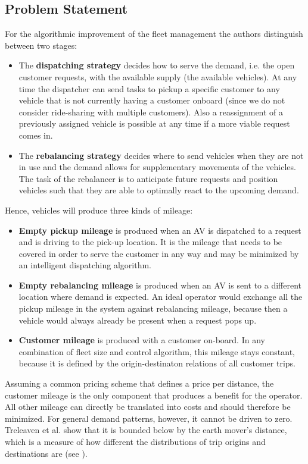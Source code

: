 \subsection{Problem Statement}

For the algorithmic improvement of the fleet management the authors distinguish
between two stages:

\begin{itemize}
\item The \textbf{dispatching strategy} decides how to serve the demand, i.e.
the open customer requests, with the available supply (the available vehicles).
At any time the dispatcher can send tasks to pickup a specific customer to any
vehicle that is not currently having a customer onboard (since we do not consider
ride-sharing with multiple customers). Also a reassignment of a previously assigned
vehicle is possible at any time if a more viable request comes in.
\item The \textbf{rebalancing strategy} decides where to send vehicles when they
are not in use and the demand allows for supplementary movements of the vehicles.
The task of the rebalancer is to anticipate future requests and position vehicles
such that they are able to optimally react to the upcoming demand.
\end{itemize}

Hence, vehicles will produce three kinds of mileage:

\begin{itemize}
\item \textbf{Empty pickup mileage} is produced when an AV is dispatched
to a request and is driving to the pick-up location. It is the mileage that needs
to be covered in order to serve the customer in any way and may be minimized
by an intelligent dispatching algorithm.
\item \textbf{Empty rebalancing mileage} is produced when an AV is sent
to a different location where demand is expected. An ideal operator would
exchange all the pickup mileage in the system against rebalancing mileage, because
then a vehicle would always already be present when a request pops up.
\item \textbf{Customer mileage} is produced with a customer on-board. In any combination
of fleet size and control algorithm, this mileage stays constant, because it is
defined by the origin-destinaton relations of all customer trips.
\end{itemize}

Assuming a common pricing scheme that defines a price per distance, the customer mileage
is the only component that produces a benefit for the operator. All other mileage
can directly be translated into costs and should therefore be minimized. For general
demand patterns, however, it cannot be driven to zero. Treleaven et al. \cite{treleaven2011asymptotically}
show that it is bounded below by the earth mover's distance, which is a measure
of how different the distributions of trip origins and destinations are (see \cite{ruschendorf1985wasserstein}).

